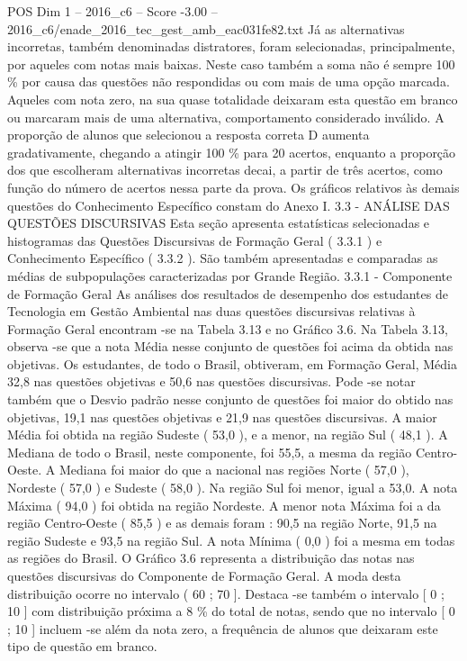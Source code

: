 \begin{textsample}{POS Dim 1 – 2016\_c6 – Score -3.00 – 2016\_c6/enade\_2016\_tec\_gest\_amb\_eac031fe82.txt}
Já as alternativas incorretas, também denominadas distratores, foram selecionadas, principalmente, por aqueles com notas mais baixas.
Neste caso também a soma não é sempre 100 \% por causa das questões não respondidas ou com mais de uma opção marcada.
Aqueles com nota zero, na sua quase totalidade deixaram esta questão em branco ou marcaram mais de uma alternativa, comportamento considerado inválido.
A proporção de alunos que selecionou a resposta correta D aumenta gradativamente, chegando a atingir 100 \% para 20 acertos, enquanto a proporção dos que escolheram alternativas incorretas decai, a partir de três acertos, como função do número de acertos nessa parte da prova.
Os gráficos relativos às demais questões do Conhecimento Específico constam do Anexo I. 3.3 - ANÁLISE DAS QUESTÕES DISCURSIVAS Esta seção apresenta estatísticas selecionadas e histogramas das Questões Discursivas de Formação Geral ( 3.3.1 ) e Conhecimento Específico ( 3.3.2 ).
São também apresentadas e comparadas as médias de subpopulações caracterizadas por Grande Região. 3.3.1 - Componente de Formação Geral As análises dos resultados de desempenho dos estudantes de Tecnologia em Gestão Ambiental nas duas questões discursivas relativas à Formação Geral encontram -se na Tabela 3.13 e no Gráfico 3.6.
Na Tabela 3.13, observa -se que a nota Média nesse conjunto de questões foi acima da obtida nas objetivas.
Os estudantes, de todo o Brasil, obtiveram, em Formação Geral, Média 32,8 nas questões objetivas e 50,6 nas questões discursivas.
Pode -se notar também que o Desvio padrão nesse conjunto de questões foi maior do obtido nas objetivas, 19,1 nas questões objetivas e 21,9 nas questões discursivas.
A maior Média foi obtida na região Sudeste ( 53,0 ), e a menor, na região Sul ( 48,1 ).
A Mediana de todo o Brasil, neste componente, foi 55,5, a mesma da região Centro-Oeste.
A Mediana foi maior do que a nacional nas regiões Norte ( 57,0 ), Nordeste ( 57,0 ) e Sudeste ( 58,0 ).
Na região Sul foi menor, igual a 53,0.
A nota Máxima ( 94,0 ) foi obtida na região Nordeste.
A menor nota Máxima foi a da região Centro-Oeste ( 85,5 ) e as demais foram : 90,5 na região Norte, 91,5 na região Sudeste e 93,5 na região Sul.
A nota Mínima ( 0,0 ) foi a mesma em todas as regiões do Brasil.
O Gráfico 3.6 representa a distribuição das notas nas questões discursivas do Componente de Formação Geral.
A moda desta distribuição ocorre no intervalo ( 60 ; 70 ].
Destaca -se também o intervalo [ 0 ; 10 ] com distribuição próxima a 8 \% do total de notas, sendo que no intervalo [ 0 ; 10 ] incluem -se além da nota zero, a frequência de alunos que deixaram este tipo de questão em branco.

\end{textsample}
